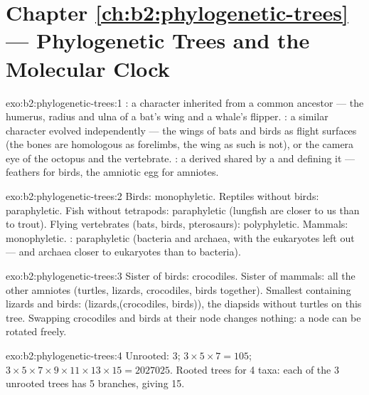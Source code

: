 \section*{Chapter \ref{ch:b2:phylogenetic-trees} --- Phylogenetic Trees and the Molecular Clock}

\begin{solution}{exo:b2:phylogenetic-trees:1}
: a character inherited from a common ancestor --- the
humerus, radius and ulna of a bat's wing and a whale's flipper.
: a similar character evolved independently --- the wings of
bats and birds as flight surfaces (the bones are homologous as
forelimbs, the wing as such is not), or the camera eye of the
octopus and the vertebrate. : a derived  shared
by a  and defining it --- feathers for birds, the amniotic egg
for amniotes.
\end{solution}

\begin{solution}{exo:b2:phylogenetic-trees:2}
Birds: monophyletic. Reptiles without birds: paraphyletic. Fish
without tetrapods: paraphyletic (lungfish are closer to us than to
trout). Flying vertebrates (bats, birds, pterosaurs): polyphyletic.
Mammals: monophyletic. : paraphyletic (bacteria and
archaea, with the eukaryotes left out --- and archaea closer to
eukaryotes than to bacteria).
\end{solution}

\begin{solution}{exo:b2:phylogenetic-trees:3}
Sister of birds: crocodiles. Sister of mammals: all the other
amniotes (turtles, lizards, crocodiles, birds together). Smallest
 containing lizards and birds: (lizards,(crocodiles, birds)),
the diapsids without turtles on this tree. Swapping crocodiles and
birds at their node changes nothing: a node can be rotated freely.
\end{solution}

\begin{solution}{exo:b2:phylogenetic-trees:4}
Unrooted: $3$; $3\times 5\times 7 = 105$; $3\times 5\times
7\times 9\times 11\times 13\times 15 = \num{2027025}$. Rooted trees
for 4 taxa: each of the 3 unrooted trees has 5 branches, giving 15.
\end{solution}

